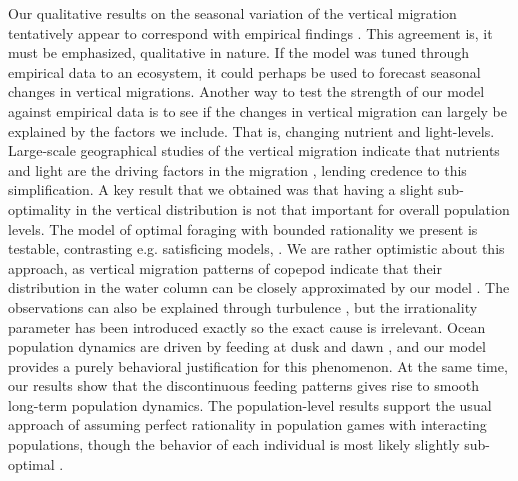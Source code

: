 


Our qualitative results on the seasonal variation of the vertical migration tentatively appear to correspond with empirical findings \citep{wang2014seasonal, beaugrand2001geographical, colebrook1979continuous}. This agreement is, it must be emphasized, qualitative in nature. If the model was tuned through empirical data to an ecosystem, it could perhaps be used to forecast seasonal changes in vertical migrations. Another way to test the strength of our model against empirical data is to see if the changes in vertical migration can largely be explained by the factors we include. That is, changing nutrient and light-levels. Large-scale geographical studies of the vertical migration indicate that nutrients and light are the driving factors in the migration \citep{klevjer2016large}, lending credence to this simplification. A key result that we obtained was that having a slight sub-optimality in the vertical distribution is not that important for overall population levels. The model of optimal foraging with bounded rationality we present is testable, contrasting e.g. satisficing models, \citep{nonacs1993satisficing}. We are rather optimistic about this approach, as vertical migration patterns of copepod indicate that their distribution in the water column can be closely approximated by our model \citep{hay1991zooplankton, visser2001observations}. The observations can also be explained through turbulence \citep{visser2001observations}, but the irrationality parameter has been introduced exactly so the exact cause is irrelevant. Ocean population dynamics are driven by feeding at dusk and dawn \citep{benoit2014critical}, and our model provides a purely behavioral justification for this phenomenon. At the same time, our results show that the discontinuous feeding patterns gives rise to smooth long-term population dynamics. The population-level results support the usual approach of assuming perfect rationality in population games with interacting populations, though the behavior of each individual is most likely slightly sub-optimal \citep{hurly1999context}.


